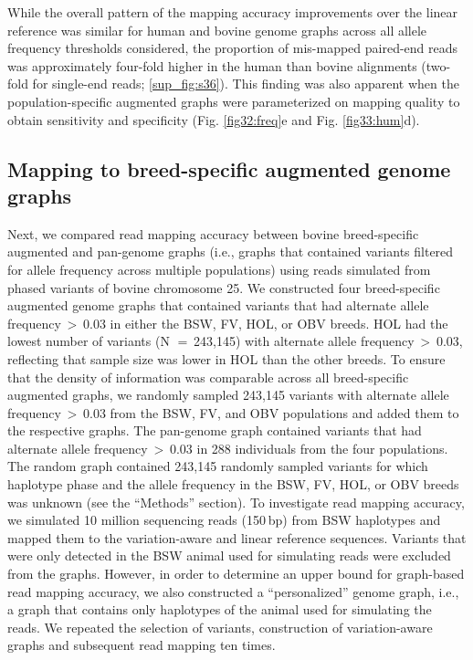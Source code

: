 \documentclass[../main.tex]{subfiles}
\begin{document}
While the overall pattern of the mapping accuracy improvements over the linear reference was similar for human and bovine genome graphs across all allele frequency thresholds considered, the proportion of mis-mapped paired-end reads was approximately four-fold higher in the human than bovine alignments (two-fold for single-end reads; \ref{sup_fig:s36}). This finding was also apparent when the population-specific augmented graphs were parameterized on mapping quality to obtain sensitivity and specificity (Fig. \ref{fig32:freq}e and Fig. \ref{fig33:hum}d).

\subsection*{Mapping to breed-specific augmented genome graphs}

Next, we compared read mapping accuracy between bovine breed-specific augmented and pan-genome graphs (i.e., graphs that contained variants filtered for allele frequency across multiple populations) using reads simulated from phased variants of bovine chromosome 25. We constructed four breed-specific augmented genome graphs that contained variants that had alternate allele frequency $>$ 0.03 in either the BSW, FV, HOL, or OBV breeds. HOL had the lowest number of variants (N $=$ 243,145) with alternate allele frequency $>$ 0.03, reflecting that sample size was lower in HOL than the other breeds. To ensure that the density of information was comparable across all breed-specific augmented graphs, we randomly sampled 243,145 variants with alternate allele frequency $>$ 0.03 from the BSW, FV, and OBV populations and added them to the respective graphs. The pan-genome graph contained variants that had alternate allele frequency $>$ 0.03 in 288 individuals from the four populations. The random graph contained 243,145 randomly sampled variants for which haplotype phase and the allele frequency in the BSW, FV, HOL, or OBV breeds was unknown (see the “Methods” section). To investigate read mapping accuracy, we simulated 10 million sequencing reads (150 bp) from BSW haplotypes and mapped them to the variation-aware and linear reference sequences. Variants that were only detected in the BSW animal used for simulating reads were excluded from the graphs. However, in order to determine an upper bound for graph-based read mapping accuracy, we also constructed a “personalized” genome graph, i.e., a graph that contains only haplotypes of the animal used for simulating the reads. We repeated the selection of variants, construction of variation-aware graphs and subsequent read mapping ten times.
\end{document}
